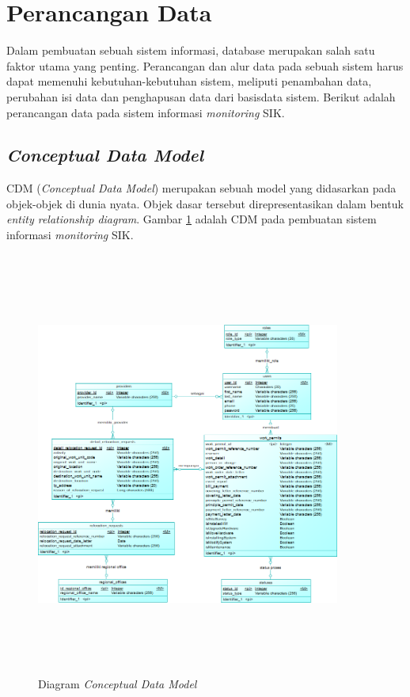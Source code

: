\newpage
\section{Perancangan Data}
\tab Dalam pembuatan sebuah sistem informasi, database merupakan salah satu faktor utama yang penting. Perancangan dan alur data pada sebuah sistem harus dapat memenuhi kebutuhan-kebutuhan sistem, meliputi penambahan data, perubahan isi data dan penghapusan data dari basisdata sistem. Berikut adalah perancangan data pada sistem informasi \textit{monitoring} SIK.
\subsection{\textit{Conceptual Data Model}}
CDM (\textit{Conceptual Data Model}) merupakan sebuah model yang didasarkan pada objek-objek di dunia nyata. Objek dasar tersebut direpresentasikan dalam bentuk \textit{entity relationship diagram}. Gambar \ref{figure:CDM} adalah CDM pada pembuatan sistem informasi \textit{monitoring} SIK.
	\begin{figure}[h!]
	\centerline
	{\includegraphics[width=10cm,height=14cm]{bab4/CDM.png}}
	\caption{Diagram \textit{Conceptual Data Model}}
	\label{figure:CDM}
	\end{figure}
	
